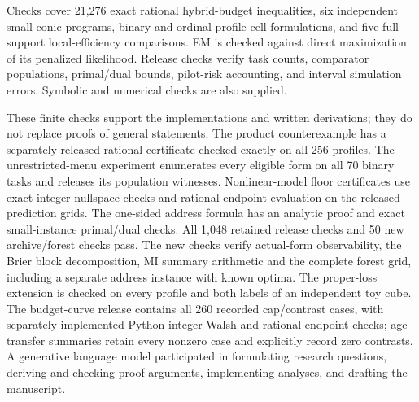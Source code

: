 Checks cover 21,276 exact rational hybrid-budget inequalities, six independent
small conic programs, binary and ordinal profile-cell formulations, and five
full-support local-efficiency comparisons. EM is checked against direct
maximization of its penalized likelihood. Release checks verify task counts,
comparator populations, primal/dual bounds, pilot-risk accounting, and
interval simulation errors. Symbolic and numerical checks are also supplied.

These finite checks support the implementations and written derivations;
they do not replace proofs of general statements. The product counterexample
has a separately released rational certificate checked exactly on all 256
profiles. The unrestricted-menu experiment enumerates every eligible form
on all 70 binary tasks and releases its population witnesses. Nonlinear-model
floor certificates use exact integer nullspace checks and rational endpoint
evaluation on the released prediction grids. The one-sided address formula
has an analytic proof and exact small-instance primal/dual checks.
All 1,048 retained release checks and 50 new archive/forest checks pass.
The new checks verify actual-form observability, the Brier block
decomposition, MI summary arithmetic and the complete forest grid,
including a separate address instance with known optima. The proper-loss extension is
checked on every profile and both labels of
an independent toy cube. The budget-curve release contains all 260
recorded cap/contrast cases, with separately implemented Python-integer
Walsh and rational endpoint checks; age-transfer summaries retain every
nonzero case and explicitly record zero contrasts.
A generative language
model participated in formulating research questions, deriving and checking
proof arguments, implementing analyses, and drafting the manuscript.
